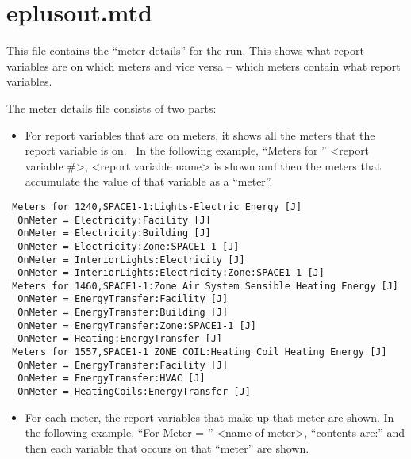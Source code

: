\section{eplusout.mtd}

This file contains the “meter details” for the run. This shows what report variables are on which meters and vice versa – which meters contain what report variables.

The meter details file consists of two parts:

\begin{itemize}
  \item For report variables that are on meters, it shows all the meters that the report variable is on.  In the following example, ``Meters for '' <report variable \#>, <report variable name> is shown and then the meters that accumulate the value of that variable as a “meter”.
\end{itemize}

\begin{lstlisting}
 Meters for 1240,SPACE1-1:Lights-Electric Energy [J]
  OnMeter = Electricity:Facility [J]
  OnMeter = Electricity:Building [J]
  OnMeter = Electricity:Zone:SPACE1-1 [J]
  OnMeter = InteriorLights:Electricity [J]
  OnMeter = InteriorLights:Electricity:Zone:SPACE1-1 [J]
 Meters for 1460,SPACE1-1:Zone Air System Sensible Heating Energy [J]
  OnMeter = EnergyTransfer:Facility [J]
  OnMeter = EnergyTransfer:Building [J]
  OnMeter = EnergyTransfer:Zone:SPACE1-1 [J]
  OnMeter = Heating:EnergyTransfer [J]
 Meters for 1557,SPACE1-1 ZONE COIL:Heating Coil Heating Energy [J]
  OnMeter = EnergyTransfer:Facility [J]
  OnMeter = EnergyTransfer:HVAC [J]
  OnMeter = HeatingCoils:EnergyTransfer [J]
\end{lstlisting}

\begin{itemize}
  \item For each meter, the report variables that make up that meter are shown. In the following example, ``For Meter = '' <name of meter>, ``contents are:'' and then each variable that occurs on that ``meter'' are shown.
\end{itemize}


